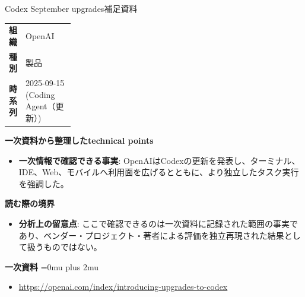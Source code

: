\begin{technicalnote}{Codex September upgrades}{補足資料}
\begingroup
\begin{tabularx}{\linewidth}{@{}>{\bfseries}p{0.22\linewidth}X@{}}
組織 & OpenAI \\
種別 & 製品 \\
時系列 & 2025-09-15 (Coding Agent（更新）) \\
\end{tabularx}
\smallskip
{\bfseries 一次資料から整理したtechnical points}
\begin{itemize}[leftmargin=1.5em,itemsep=0.35em]
\item \textbf{一次情報で確認できる事実}: OpenAIはCodexの更新を発表し、ターミナル、IDE、Web、モバイルへ利用面を広げるとともに、より独立したタスク実行を強調した。
\end{itemize}
\begin{minipage}{\linewidth}
{\bfseries 読む際の境界}
\begin{itemize}[leftmargin=1.5em,itemsep=0.35em]
\item \textbf{分析上の留意点}: ここで確認できるのは一次資料に記録された範囲の事実であり、ベンダー・プロジェクト・著者による評価を独立再現された結果として扱うものではない。
\end{itemize}
\begin{samepage}
{\bfseries 一次資料}
\begingroup\sloppy
\Urlmuskip=0mu plus 2mu\relax
\begin{itemize}[leftmargin=1.5em,itemsep=0.25em]
\item {\scriptsize\url{https://openai.com/index/introducing-upgrades-to-codex}}
\end{itemize}
\endgroup
\end{samepage}
\end{minipage}
\endgroup
\end{technicalnote}
\medskip

